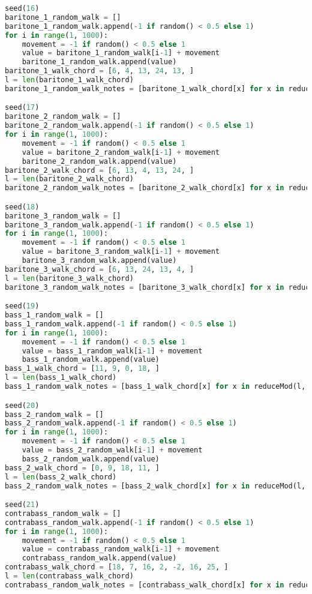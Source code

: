 \begin{lstlisting}[language=Python, caption=Invocation Source Code]
seed(16)
baritone_1_random_walk = []
baritone_1_random_walk.append(-1 if random() < 0.5 else 1)
for i in range(1, 1000):
    movement = -1 if random() < 0.5 else 1
    value = baritone_1_random_walk[i-1] + movement
    baritone_1_random_walk.append(value)
baritone_1_walk_chord = [6, 4, 13, 24, 13, ]
l = len(baritone_1_walk_chord)
baritone_1_random_walk_notes = [baritone_1_walk_chord[x] for x in reduceMod(l, baritone_1_random_walk)]

seed(17)
baritone_2_random_walk = []
baritone_2_random_walk.append(-1 if random() < 0.5 else 1)
for i in range(1, 1000):
    movement = -1 if random() < 0.5 else 1
    value = baritone_2_random_walk[i-1] + movement
    baritone_2_random_walk.append(value)
baritone_2_walk_chord = [6, 13, 4, 13, 24, ]
l = len(baritone_2_walk_chord)
baritone_2_random_walk_notes = [baritone_2_walk_chord[x] for x in reduceMod(l, baritone_2_random_walk)]

seed(18)
baritone_3_random_walk = []
baritone_3_random_walk.append(-1 if random() < 0.5 else 1)
for i in range(1, 1000):
    movement = -1 if random() < 0.5 else 1
    value = baritone_3_random_walk[i-1] + movement
    baritone_3_random_walk.append(value)
baritone_3_walk_chord = [6, 13, 24, 13, 4, ]
l = len(baritone_3_walk_chord)
baritone_3_random_walk_notes = [baritone_3_walk_chord[x] for x in reduceMod(l, baritone_3_random_walk)]

seed(19)
bass_1_random_walk = []
bass_1_random_walk.append(-1 if random() < 0.5 else 1)
for i in range(1, 1000):
    movement = -1 if random() < 0.5 else 1
    value = bass_1_random_walk[i-1] + movement
    bass_1_random_walk.append(value)
bass_1_walk_chord = [11, 9, 0, 18, ]
l = len(bass_1_walk_chord)
bass_1_random_walk_notes = [bass_1_walk_chord[x] for x in reduceMod(l, bass_1_random_walk)]

seed(20)
bass_2_random_walk = []
bass_2_random_walk.append(-1 if random() < 0.5 else 1)
for i in range(1, 1000):
    movement = -1 if random() < 0.5 else 1
    value = bass_2_random_walk[i-1] + movement
    bass_2_random_walk.append(value)
bass_2_walk_chord = [0, 9, 18, 11, ]
l = len(bass_2_walk_chord)
bass_2_random_walk_notes = [bass_2_walk_chord[x] for x in reduceMod(l, bass_2_random_walk)]

seed(21)
contrabass_random_walk = []
contrabass_random_walk.append(-1 if random() < 0.5 else 1)
for i in range(1, 1000):
    movement = -1 if random() < 0.5 else 1
    value = contrabass_random_walk[i-1] + movement
    contrabass_random_walk.append(value)
contrabass_walk_chord = [18, 7, 16, 2, -2, 16, 25, ]
l = len(contrabass_walk_chord)
contrabass_random_walk_notes = [contrabass_walk_chord[x] for x in reduceMod(l, contrabass_random_walk)]


\end{lstlisting}

